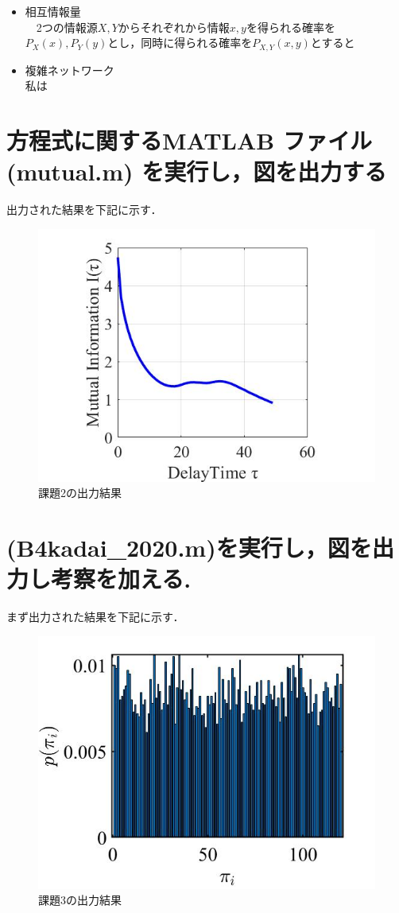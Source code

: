 \documentclass[autodetect-engine,dvipdfmx-if-dvi,ja=standard,a4paper,11pt]{bxjsarticle} %
\begin{document}
\begin{itemize}
\item 相互情報量\\%
　2つの情報源$X,Y$からそれぞれから情報$x,y$を得られる確率を$P_X(x),P_Y(y)$とし，同時に得られる確率を$P_{X,Y}(x,y)$とすると
\\


\item 複雑ネットワーク\\%
私は
\\

\end{itemize}


\section{ 方程式に関するMATLAB ファイル(mutual.m) を実行し，図を出力する}
出力された結果を下記に示す．

\begin{figure}[H]%
\begin{center}
\includegraphics[width=.4\textwidth]{kadai2_rusult.jpg}
\end{center}
\caption{課題2の出力結果}%
\label{fig:kadai2}
\end{figure}


\section{(B4kadai\_2020.m)を実行し，図を出力し考察を加える.}
まず出力された結果を下記に示す．

\begin{figure}[H]%
\begin{center}
\includegraphics[width=.4\textwidth]{kadai3_rusult.jpg}
\end{center}
\caption{課題3の出力結果}%
\label{fig:kadai3}
\end{figure}
\end{document}
